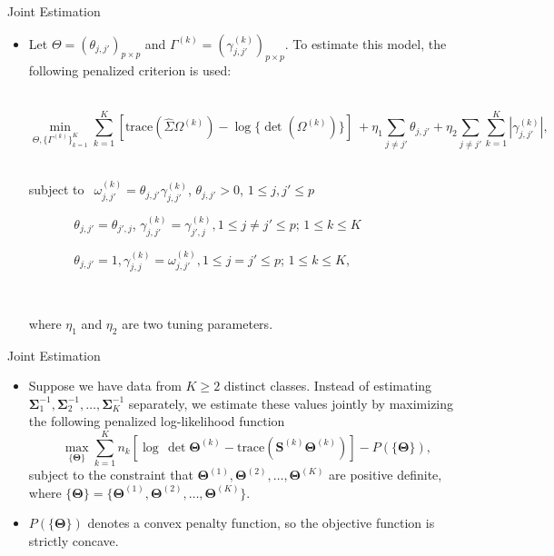 \documentclass[xcolor=dvipsnames,aspectratio=1610]{beamer}
\theoremstyle{remark}
\begin{document}
\begin{frame}{Joint Estimation}
  \begin{itemize}
    \setlength{\itemsep}{10pt}
\item          Let $\Theta = (\theta_{j,j'})_{p\times p}$ and $\Gamma^{(k)} = (\gamma_{j,j'}^{(k)})_{p\times p}$. To estimate this model, the following penalized criterion is used:
        
        \
        \begin{equation}
        \underset{\Theta,\{ \Gamma^{(k)}\}_{k=1}^{K}}{\min}   \sum_{k=1}^{K} [\mbox{trace}(\hat{\Sigma} \Omega^{(k)}) - \log\{ \det(\Omega^{(k)})\}] \ +  \eta_1 \underset{j \neq j'}{\sum} \theta_{j,j'} +   
        \eta_2 \underset{j \neq j'}{\sum} \sum_{k=1}^K |\gamma_{j,j'}^{(k)}|,
        \end{equation}
        \
        
        subject to    $ \ \ \omega_{j,j'}^{(k)}=\theta_{j,j'} \gamma_{j,j'}^{(k)}$, $\theta_{j,j'} > 0$, $1 \leq j,j' \leq p$
        
        $\ \ \ \ \ \ \ \ \ \ \ \ \ \ \ \ \theta_{j,j'} = \theta_{j',j}$, $\gamma_{j,j'}^{(k)} = \gamma_{j',j}^{(k)}, 1 \leq j \neq j' \leq p$; $1 \leq k \leq K$
        
        $\ \ \ \ \ \ \ \ \ \ \ \ \  \ \ \ \theta_{j,j'}=1,\gamma_{j,j}^{(k)}=\omega_{j,j'}^{(k)} , 1 \leq j = j' \leq p$; $1 \leq k \leq K$,
        
        \
        
        where $\eta_1$ and $\eta_2$ are two tuning parameters. 

  \end{itemize}
\end{frame}


\begin{frame}{Joint Estimation}
  \begin{itemize}
    \setlength{\itemsep}{10pt}
\item   
Suppose we have data from $K \geq 2$ distinct classes.  Instead of estimating $\bm{\Sigma}_{1}^{-1},\bm{\Sigma}_{2}^{-1},\ldots,\bm{\Sigma}_{K}^{-1}$ separately, we estimate these values jointly by maximizing the following penalized log-likelihood function
\small
\begin{equation*}
\max_{\{\bm{\Theta}\}} \sum_{k=1}^{K}n_{k}\left[\log\,\det \bm{\Theta}^{(k)}-\mbox{trace}\left(\bm{S}^{(k)}\bm{\Theta}^{(k)}\right)\right] - P(\{\bm{\Theta}\}),
\end{equation*}
\normalsize
subject to the constraint that $\bm{\Theta}^{(1)},\bm{\Theta}^{(2)},\ldots,\bm{\Theta}^{(K)}$ are positive definite, where $\{\bm{\Theta}\} = \{\bm{\Theta}^{(1)},\bm{\Theta}^{(2)},\ldots,\bm{\Theta}^{(K)}\}$.

\item $P(\{\bm{\Theta}\})$ denotes a convex penalty function, so the objective function is strictly concave.
  \end{itemize}
\end{frame}
\end{document}
